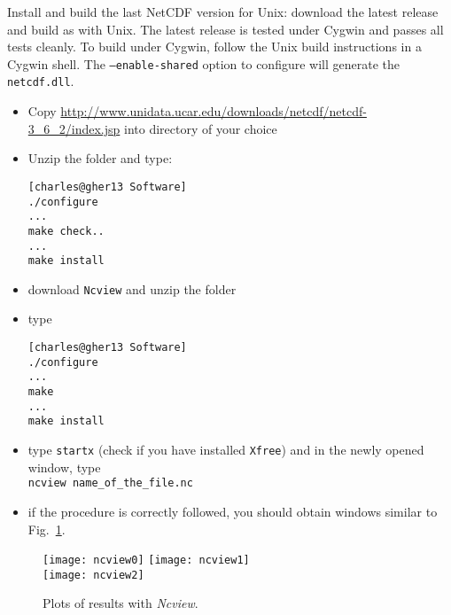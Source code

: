 Install and build the last NetCDF version for Unix: download the latest release and build as with Unix. The latest release is tested under Cygwin and passes all tests cleanly. To build under Cygwin, follow the Unix build instructions in a Cygwin shell. The \texttt{--enable-shared} option to configure will generate the \texttt{netcdf.dll}. 


\begin{itemize}
\item Copy \url{http://www.unidata.ucar.edu/downloads/netcdf/netcdf-3_6_2/index.jsp}  into directory of your choice
\item Unzip the folder  and type:
\begin{lstlisting}[style=Bash]
[charles@gher13 Software]
./configure
...
make check..
...
make install
\end{lstlisting}

\item download \texttt{Ncview} and unzip the folder
\item type\\ 
\begin{lstlisting}[style=Bash]
[charles@gher13 Software]
./configure
...
make 
...
make install
\end{lstlisting}

\item type \texttt{startx} (check if you have installed \texttt{Xfree}) and in the newly opened window, type\\
\texttt{ncview name\_of\_the\_file.nc}

\item if the procedure is correctly followed, you should obtain windows similar to Fig.~\ref{fig:ncview}.
\end{itemize}

\begin{figure}[htpb]
\centering
\texttt{[image: ncview0]}\hspace{.5cm} \texttt{[image: ncview1]} \\
\vspace{.5cm}
\texttt{[image: ncview2]} \caption{Plots of results with \textsl{Ncview}.\label{fig:ncview}}
\end{figure}

